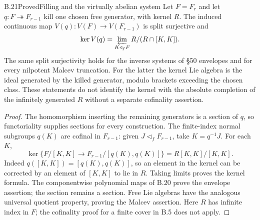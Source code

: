\begin{statement}{B.21}{Proved}{Filling and the virtually abelian system}
Let $F=F_r$ and let $q:F\twoheadrightarrow F_{r-1}$ kill one chosen
free generator, with kernel $R$. The induced continuous map
$V(q):V(F)\to V(F_{r-1})$ is split surjective and
\[
 \ker V(q)=
 \varprojlim_{K\triangleleft_f F} R/(R\cap[K,K]).
\]
The same split surjectivity holds for the inverse systems of
\S50 envelopes and for every nilpotent Malcev truncation.
For the latter the kernel Lie algebra is the ideal generated by
the killed generator, modulo brackets exceeding the chosen class.
These statements do not identify the kernel with the absolute
completion of the infinitely generated $R$ without a separate
cofinality assertion.
\end{statement}
\begin{proof}
The homomorphism inserting the remaining generators is a section of
$q$, so functoriality supplies sections for every construction.
The finite-index normal subgroups $q(K)$ are cofinal in $F_{r-1}$:
given $J\triangleleft_fF_{r-1}$, take $K=q^{-1}J$.
For each $K$,
\[
 \ker\{F/[K,K]\to F_{r-1}/[q(K),q(K)]\}
 =R[K,K]/[K,K].
\]
Indeed $q([K,K])=[q(K),q(K)]$, so an element in the kernel can
be corrected by an element of $[K,K]$ to lie in $R$.
Taking limits proves the kernel formula. The componentwise
polynomial maps of B.20 prove the envelope assertion; the
section remains a section. Free Lie algebras have the analogous
universal quotient property, proving the Malcev assertion.
Here $R$ has infinite index in $F$; the cofinality proof for a
finite cover in B.5 does not apply.
\end{proof}

